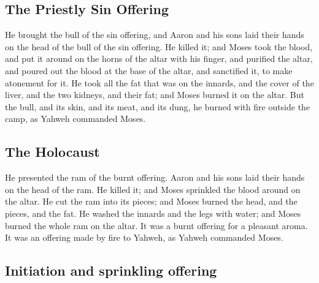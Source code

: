 \begin{paracol}{2}
\begin{otherlanguage}{english}
\hypertarget{the-priestly-sin-offering}{%
\subsection{The Priestly Sin Offering}\label{the-priestly-sin-offering}}

 He brought the bull of the sin offering, and Aaron and
his sons laid their hands on the head of the bull of the sin offering.
 He killed it; and Moses took the blood, and put it
around on the horns of the altar with his finger, and purified the
altar, and poured out the blood at the base of the altar, and sanctified
it, to make atonement for it.  He took all the fat that
was on the innards, and the cover of the liver, and the two kidneys, and
their fat; and Moses burned it on the altar.  But the
bull, and its skin, and its meat, and its dung, he burned with fire
outside the camp, as Yahweh commanded Moses.

\hypertarget{the-holocaust}{%
\subsection{The Holocaust}\label{the-holocaust}}

 He presented the ram of the burnt offering. Aaron and
his sons laid their hands on the head of the ram.  He
killed it; and Moses sprinkled the blood around on the altar.
 He cut the ram into its pieces; and Moses burned the
head, and the pieces, and the fat.  He washed the innards
and the legs with water; and Moses burned the whole ram on the altar. It
was a burnt offering for a pleasant aroma. It was an offering made by
fire to Yahweh, as Yahweh commanded Moses.

\hypertarget{initiation-and-sprinkling-offering}{%
\subsection{Initiation and sprinkling
offering}\label{initiation-and-sprinkling-offering}}


\end{otherlanguage}
\end{paracol}
